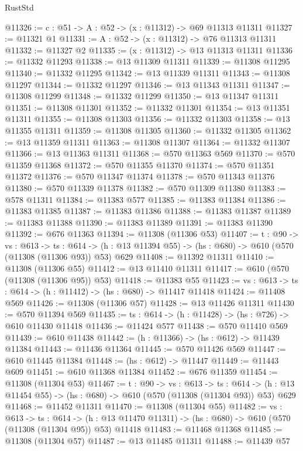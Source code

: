 \begin{lexlean}{RustStd}
\begin{coremodule}
@11326 := {c : @51} -> {A : @52} -> (x : @11312) -> @69 @11313 @11311
@11327 := @11321 @1
@11331 := {A : @52} -> (x : @11312) -> @76 @11313 @11311
@11332 := @11327 @2
@11335 := (x : @11312) -> @13 @11313 @11311
@11336 := @11332 @11293
@11338 := @13 @11309 @11311
@11339 := @11308 @11295
@11340 := @11332 @11295
@11342 := @13 @11339 @11311
@11343 := @11308 @11297
@11344 := @11332 @11297
@11346 := @13 @11343 @11311
@11347 := @11308 @11299
@11348 := @11332 @11299
@11350 := @13 @11347 @11311
@11351 := @11308 @11301
@11352 := @11332 @11301
@11354 := @13 @11351 @11311
@11355 := @11308 @11303
@11356 := @11332 @11303
@11358 := @13 @11355 @11311
@11359 := @11308 @11305
@11360 := @11332 @11305
@11362 := @13 @11359 @11311
@11363 := @11308 @11307
@11364 := @11332 @11307
@11366 := @13 @11363 @11311
@11368 := @570 @11363 @569
@11370 := @570 @11359 @11368
@11372 := @570 @11355 @11370
@11374 := @570 @11351 @11372
@11376 := @570 @11347 @11374
@11378 := @570 @11343 @11376
@11380 := @570 @11339 @11378
@11382 := @570 @11309 @11380
@11383 := @578 @11311
@11384 := @11383 @577
@11385 := @11383 @11384
@11386 := @11383 @11385
@11387 := @11383 @11386
@11388 := @11383 @11387
@11389 := @11383 @11388
@11390 := @11383 @11389
@11391 := @11383 @11390
@11392 := @676 @11363
@11394 := @11308 (@11306 @53)
@11407 := {t : @90} ->
  {vs : @613} ->
  {ts : @614} -> (h : @13 @11394 @55) -> (hs : @680) -> @610 (@570 (@11308 (@11306 @93)) @53) @629
@11408 := @11392 @11311
@11410 := @11308 (@11306 @55)
@11412 := @13 @11410 @11311
@11417 := @610 (@570 (@11308 (@11306 @95)) @53)
@11418 := @11383 @55
@11423 := {vs : @613} -> {ts : @614} -> (h : @11412) -> (hs : @680) -> @11417 @11418
@11424 := @11408 @569
@11426 := @11308 (@11306 @57)
@11428 := @13 @11426 @11311
@11430 := @570 @11394 @569
@11435 := {ts : @614} -> (h : @11428) -> (hs : @726) -> @610 @11430 @11418
@11436 := @11424 @577
@11438 := @570 @11410 @569
@11439 := @610 @11438
@11442 := (h : @11366) -> (hs : @612) -> @11439 @11384
@11443 := @11436 @11364
@11445 := @570 @11426 @569
@11447 := @610 @11445 @11384
@11448 := (hs : @612) -> @11447
@11449 := @11443 @609
@11451 := @610 @11368 @11384
@11452 := @676 @11359
@11454 := @11308 (@11304 @53)
@11467 := {t : @90} ->
  {vs : @613} ->
  {ts : @614} -> (h : @13 @11454 @55) -> (hs : @680) -> @610 (@570 (@11308 (@11304 @93)) @53) @629
@11468 := @11452 @11311
@11470 := @11308 (@11304 @55)
@11482 := {vs : @613} ->
  {ts : @614} ->
  (h : @13 @11470 @11311) -> (hs : @680) -> @610 (@570 (@11308 (@11304 @95)) @53) @11418
@11483 := @11468 @11368
@11485 := @11308 (@11304 @57)
@11487 := @13 @11485 @11311
@11488 := @11439 @57

\end{coremodule}
\end{lexlean}
